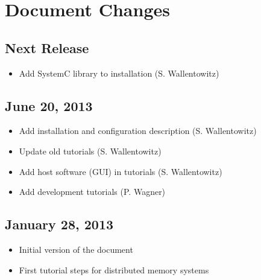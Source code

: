 \section*{Document Changes}


\subsection*{Next Release} %
\begin{itemize}
\item Add SystemC library to installation (S. Wallentowitz)
\end{itemize}

\subsection*{June 20, 2013}
\begin{itemize}
\item Add installation and configuration description (S. Wallentowitz)
\item Update old tutorials (S. Wallentowitz)
\item Add host software (GUI) in tutorials (S. Wallentowitz)
\item Add development tutorials (P. Wagner) 
\end{itemize}

\subsection*{January 28, 2013}
\begin{itemize}
\item Initial version of the document
\item First tutorial steps for distributed memory systems
\end{itemize}